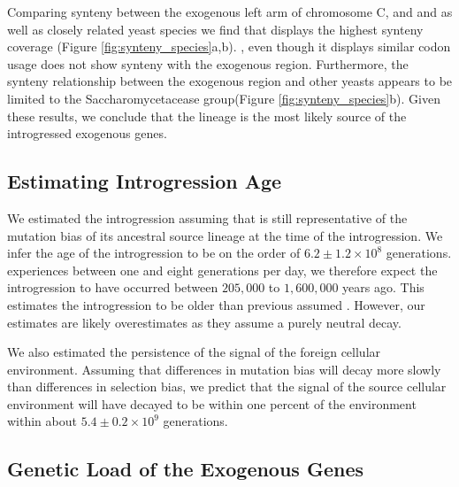 Comparing synteny between the exogenous left arm of chromosome C, and \gossypii and \dubl as well as closely related yeast species we find that \gossypii displays the highest synteny coverage  (Figure \ref{fig:synteny_species}a,b).
\dubl, even though it displays similar codon usage does not show synteny with the exogenous region.
Furthermore, the synteny relationship between the exogenous region and other yeasts appears to be limited to the Saccharomycetacease group(Figure \ref{fig:synteny_species}b).
Given these results, we conclude that the \gossypii lineage is the most likely source of the introgressed exogenous genes.

\subsection{Estimating Introgression Age}

We estimated the introgression assuming that \gossypii is still representative of the mutation bias of its ancestral source lineage at the time of the introgression.
We infer the age of the introgression to be on the order of $6.2\pm1.2\times 10^8$ generations. 
\kluyveri experiences between one and eight generations per day, we therefore expect the introgression to have occurred between $205,000$ to $1,600,000$ years ago.
This estimates the introgression to be older than previous assumed \citet{friedrich2015}.
However, our estimates are likely overestimates as they assume a purely neutral decay.

We also estimated the persistence of the signal of the foreign cellular environment.
Assuming that differences in mutation bias will decay more slowly than differences in selection bias, we predict that the \DM signal of the source cellular environment will have decayed to be within one percent of the \kluyveri environment within about $5.4\pm0.2\times 10^9 $ generations.

\subsection{Genetic Load of the Exogenous Genes}


